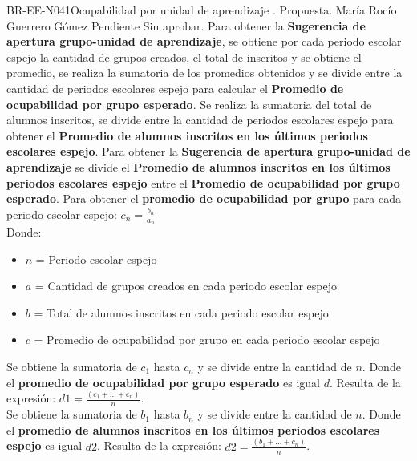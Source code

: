 \begin{BusinessRule}{BR-EE-N041}{Ocupabilidad por unidad de aprendizaje}
	{\bcIntegridad}    %
	{\btEnabler}     %
	{\blControlling}    %
	.
	\BRItem[Estado] Propuesta.
	 María Rocío Guerrero Gómez
	 Pendiente
	 Sin aprobar.
	\BRItem[Descripción] Para obtener la \textbf{Sugerencia de apertura grupo-unidad de aprendizaje}, se obtiene por cada periodo escolar espejo la cantidad de grupos creados, el total de inscritos y se obtiene el promedio, se realiza la sumatoria de los promedios obtenidos y se divide entre la cantidad de periodos escolares espejo para calcular el \textbf{Promedio de ocupabilidad por grupo esperado}. Se realiza la sumatoria del total de alumnos inscritos, se divide entre la cantidad de periodos escolares espejo para obtener el \textbf{Promedio de alumnos inscritos en los últimos periodos escolares espejo}. Para obtener la \textbf{Sugerencia de apertura grupo-unidad de aprendizaje} se divide el \textbf{Promedio de alumnos inscritos en los últimos periodos escolares espejo} entre el \textbf{Promedio de ocupabilidad por grupo esperado}.
	\BRItem[Sentencia] Para obtener el \textbf{promedio de ocupabilidad por grupo} para cada periodo escolar espejo: $c_{n}=\frac{b_{n}}{a_{n}}$\\
	Donde:
	\begin{itemize}
		\item $n$ = Periodo escolar espejo
		\item $a$ = Cantidad de grupos creados en cada periodo escolar espejo
		\item $b$ = Total de alumnos inscritos en cada periodo escolar espejo
		\item $c$ = Promedio de ocupabilidad por grupo en cada periodo escolar espejo
	\end{itemize}
	
	Se obtiene la sumatoria de $c_{1}$ hasta $c_{n}$ y se divide entre la cantidad de $n$. Donde el \textbf{promedio de ocupabilidad por grupo esperado} es igual $d$. Resulta de la expresión: $d1 = \frac{(c_{1}+...+c_{n})}{n}$.\\
	
	Se obtiene la sumatoria de $b_{1}$ hasta $b_{n}$ y se divide entre la cantidad de $n$. Donde el \textbf{promedio de alumnos inscritos en los últimos periodos escolares espejo} es igual $d2$. Resulta de la expresión: $d2 = \frac{(b_{1}+...+c_{n})}{n}$.\\
	

\end{BusinessRule}
